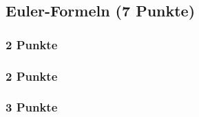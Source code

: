 \newif\ifvimbug
\vimbugfalse

\ifvimbug

\fi


\subsection{Euler-Formeln (7 Punkte)}
\subsubsection{2 Punkte}
\subsubsection{2 Punkte}
\subsubsection{3 Punkte}